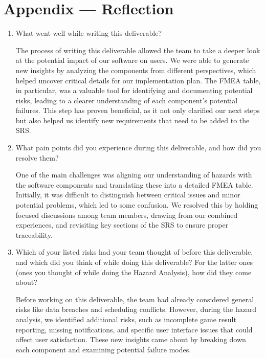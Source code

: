 \documentclass{article}
\begin{document}
\newpage{}

\section*{Appendix --- Reflection}



\begin{enumerate}
    \item What went well while writing this deliverable? 
    
    The process of writing this deliverable allowed the team to take a deeper look at the potential impact of our software on users. We were able to generate new insights by analyzing the components from different perspectives, which helped uncover critical details for our implementation plan. The FMEA table, in particular, was a valuable tool for identifying and documenting potential risks, leading to a clearer understanding of each component's potential failures. This step has proven beneficial, as it not only clarified our next steps but also helped us identify new requirements that need to be added to the SRS.

    \item What pain points did you experience during this deliverable, and how
    did you resolve them?

    One of the main challenges was aligning our understanding of hazards with the software components and translating these into a detailed FMEA table. Initially, it was difficult to distinguish between critical issues and minor potential problems, which led to some confusion. We resolved this by holding focused discussions among team members, drawing from our combined experiences, and revisiting key sections of the SRS to ensure proper traceability.

    \item Which of your listed risks had your team thought of before this
    deliverable, and which did you think of while doing this deliverable? For
    the latter ones (ones you thought of while doing the Hazard Analysis), how
    did they come about?

    Before working on this deliverable, the team had already considered general risks like data breaches and scheduling conflicts. However, during the hazard analysis, we identified additional risks, such as incomplete game result reporting, missing notifications, and specific user interface issues that could affect user satisfaction. These new insights came about by breaking down each component and examining potential failure modes.


\end{enumerate}
\end{document}
